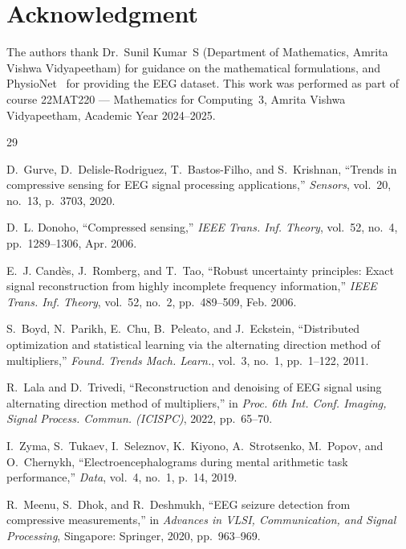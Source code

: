 \documentclass[journal,twoside,10pt]{IEEEtran}
\begin{document}
\section*{Acknowledgment}

The authors thank Dr.~Sunil Kumar~S (Department of Mathematics, Amrita Vishwa Vidyapeetham) for
guidance on the mathematical formulations, and PhysioNet~\cite{zyma2019} for providing the EEG
dataset.  This work was performed as part of course 22MAT220 --- Mathematics for Computing~3,
Amrita Vishwa Vidyapeetham, Academic Year 2024--2025.

\begin{thebibliography}{29}

D.~Gurve, D.~Delisle-Rodriguez, T.~Bastos-Filho, and S.~Krishnan,
``Trends in compressive sensing for EEG signal processing applications,''
\emph{Sensors}, vol.~20, no.~13, p.~3703, 2020.

D.~L. Donoho,
``Compressed sensing,''
\emph{IEEE Trans. Inf. Theory}, vol.~52, no.~4, pp.~1289--1306, Apr. 2006.

E.~J. Cand\`{e}s, J.~Romberg, and T.~Tao,
``Robust uncertainty principles: Exact signal reconstruction from highly incomplete frequency information,''
\emph{IEEE Trans. Inf. Theory}, vol.~52, no.~2, pp.~489--509, Feb. 2006.

S.~Boyd, N.~Parikh, E.~Chu, B.~Peleato, and J.~Eckstein,
``Distributed optimization and statistical learning via the alternating direction method of multipliers,''
\emph{Found. Trends Mach. Learn.}, vol.~3, no.~1, pp.~1--122, 2011.

R.~Lala and D.~Trivedi,
``Reconstruction and denoising of EEG signal using alternating direction method of multipliers,''
in \emph{Proc. 6th Int. Conf. Imaging, Signal Process. Commun. (ICISPC)}, 2022, pp.~65--70.

I.~Zyma, S.~Tukaev, I.~Seleznov, K.~Kiyono, A.~Strotsenko, M.~Popov, and O.~Chernykh,
``Electroencephalograms during mental arithmetic task performance,''
\emph{Data}, vol.~4, no.~1, p.~14, 2019.

R.~Meenu, S.~Dhok, and R.~Deshmukh,
``EEG seizure detection from compressive measurements,''
in \emph{Advances in VLSI, Communication, and Signal Processing},
Singapore: Springer, 2020, pp.~963--969.


\end{thebibliography}
\end{document}
